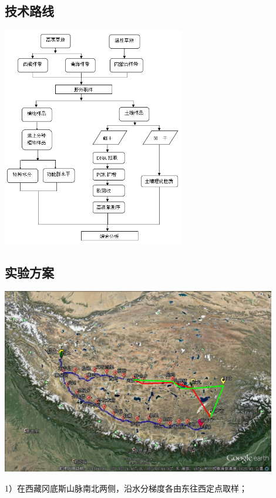 \subsection{技术路线}
\begin{frame}{\insertsubsection}
	\begin{center}
		\includegraphics[width = 0.6\textwidth]{./pic/技术路线.jpg}
	\end{center}
\end{frame}
\subsection{实验方案}
\begin{frame}{\insertsubsection}
	\begin{center}
		\includegraphics[width = 0.9\textwidth]{./pic/西藏瓦岗.jpg}
	\end{center}
	1）在西藏冈底斯山脉南北两侧，沿水分梯度各由东往西定点取样；
\end{frame}

